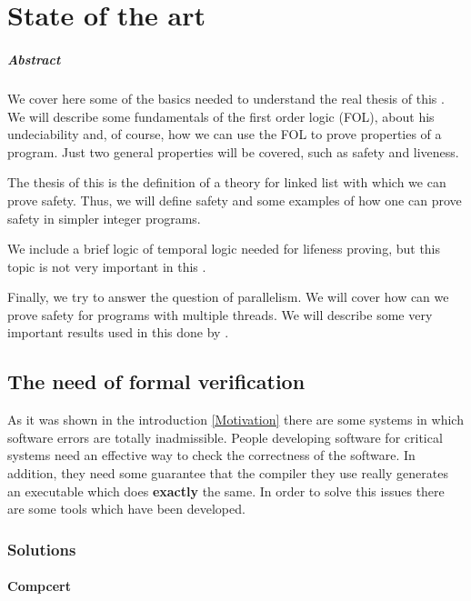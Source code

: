 \chapter{State of the art\label{sec:estado_del_arte}}

\paragraph{Abstract}

We cover here some of the basics needed to understand the real thesis of this \thisworkm. We will describe some fundamentals of the first order logic (\gls{FOL}), about his undeciability and, of course, how we can use the \gls{FOL} to prove properties of a program. Just two general properties will be covered, such as safety and liveness.

The thesis of this \thisworkm is the definition of a theory for linked list with which we can prove safety. Thus, we will define safety and some examples of how one can prove safety in simpler integer programs.

We include a brief logic of temporal logic needed for lifeness proving, but this topic is not very important in this \thisworkm.

Finally, we try to answer the question of parallelism. We will cover how can we prove safety for programs with multiple threads. We will describe some very important results used in this \thisworkm 
done by \citep{thesisAle}.

\section{The need of formal verification}

As it was shown in the introduction \ref{Motivation} there are some systems in which software errors are totally inadmissible.
%
People developing software for critical systems need an effective way to check the correctness of the software.
%
In addition, they need some guarantee that the compiler they use really generates an executable which does \textbf{exactly} the same.
%
In order to solve this issues there are some tools which have been developed.

\subsection{Solutions}

\subsubsection{Compcert}

